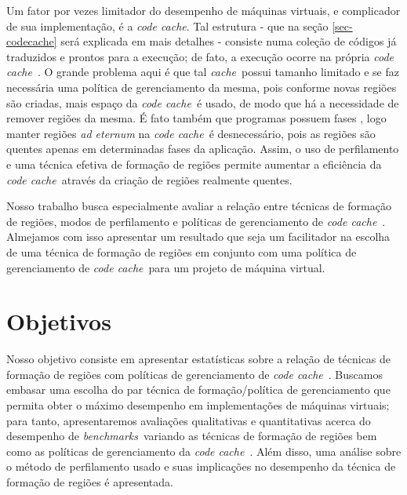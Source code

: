 \documentclass[12pt,twoside]{article}
\newcommand{\ccache}{\emph{code cache}}
\newcommand{\cache}{\emph{cache}}
\newcommand{\benchmarks}{\emph{benchmarks}}
\begin{document}
Um fator por vezes limitador do desempenho de máquinas virtuais, e complicador de sua implementação, é a \ccache. Tal estrutura - que na seção \ref{sec-codecache} será explicada em mais detalhes - consiste numa coleção de códigos já traduzidos e prontos para a execução; de fato, a execução ocorre na própria \ccache~. O grande problema aqui é que tal \cache~possui tamanho limitado e se faz necessária uma política de gerenciamento da mesma, pois conforme novas regiões são criadas, mais espaço da \ccache~é usado, de modo que há a necessidade de remover regiões da mesma. É fato também que programas possuem fases \cite{program-phases}, logo manter regiões \emph{ad eternum} na \ccache~é desnecessário, pois as regiões são quentes apenas em determinadas fases da aplicação. Assim, o uso de perfilamento e uma técnica efetiva de formação de regiões permite aumentar a eficiência da \ccache~através da criação de regiões realmente quentes.

Nosso trabalho busca especialmente avaliar a relação entre técnicas de formação de regiões, modos de perfilamento e políticas de gerenciamento de \ccache~. Almejamos com isso apresentar um resultado que seja um facilitador na escolha de uma técnica de formação de regiões em conjunto com uma política de gerenciamento de \ccache~para um projeto de máquina virtual. 


\section{Objetivos}
Nosso objetivo consiste em apresentar estatísticas sobre a relação de técnicas de formação de regiões com políticas de gerenciamento de \ccache~. Buscamos embasar uma escolha do par técnica de formação/política de gerenciamento que permita obter o máximo desempenho em implementações de máquinas virtuais; para tanto, apresentaremos avaliações qualitativas e quantitativas acerca do desempenho de \benchmarks~variando as técnicas de formação de regiões bem como as políticas de gerenciamento da \ccache~. Além disso, uma análise sobre o método de perfilamento usado e suas implicações no desempenho da técnica de formação de regiões é apresentada.
\end{document}
